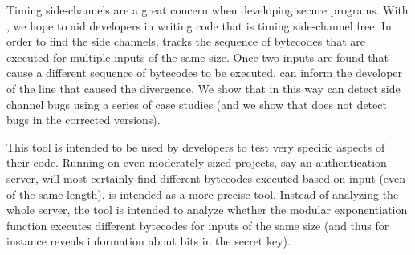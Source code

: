 Timing side-channels are a great concern when developing 
secure programs. With \jcupid, we hope to aid developers in writing
code that is timing side-channel free. In order to find the side
channels, \jcupid 
tracks the sequence of bytecodes that are executed for multiple inputs
of the same size. Once two inputs are found that cause a different
sequence of bytecodes to be executed, \jcupid can inform the developer
of the line that caused the
divergence. We show that in this way \jcupid can detect side channel
bugs using a series of case studies (and we show that \jcupid does not
detect bugs in the corrected versions).

This tool is intended to be used by developers to test very
specific aspects of their code. Running \jcupid on even moderately sized
projects, say an authentication server, will most
certainly find different bytecodes executed based on input (even of
the same length). \jcupid is intended as a more precise tool. Instead of 
analyzing the whole server, the tool is
intended to analyze whether the modular exponentiation function
executes different bytecodes for inputs of the same size (and thus for
instance reveals information about bits in the secret key). 
